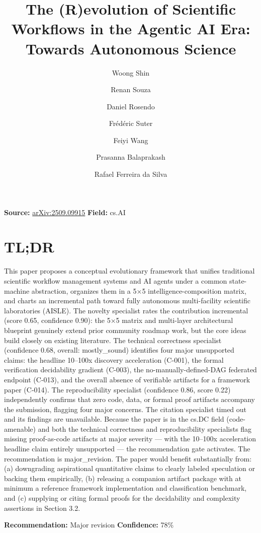 \documentclass[11pt]{article}
\title{The (R)evolution of Scientific Workflows in the Agentic AI Era: Towards Autonomous Science}
\author{Woong Shin \and Renan Souza \and Daniel Rosendo \and Frédéric Suter \and Feiyi Wang \and Prasanna Balaprakash \and Rafael Ferreira da Silva}
\date{}
\begin{document}
\maketitle

\noindent\textbf{Source:} \href{https://arxiv.org/abs/2509.09915}{arXiv:2509.09915} \quad \textbf{Field:} cs.AI\\

\section*{TL;DR}
This paper proposes a conceptual evolutionary framework that unifies traditional scientific workflow management systems and AI agents under a common state-machine abstraction, organizes them in a 5×5 intelligence-composition matrix, and charts an incremental path toward fully autonomous multi-facility scientific laboratories (AISLE). The novelty specialist rates the contribution incremental (score 0.65, confidence 0.90): the 5×5 matrix and multi-layer architectural blueprint genuinely extend prior community roadmap work, but the core ideas build closely on existing literature. The technical correctness specialist (confidence 0.68, overall: mostly\_sound) identifies four major unsupported claims: the headline 10–100x discovery acceleration (C-001), the formal verification decidability gradient (C-003), the no-manually-defined-DAG federated endpoint (C-013), and the overall absence of verifiable artifacts for a framework paper (C-014). The reproducibility specialist (confidence 0.86, score 0.22) independently confirms that zero code, data, or formal proof artifacts accompany the submission, flagging four major concerns. The citation specialist timed out and its findings are unavailable. Because the paper is in the cs.DC field (code-amenable) and both the technical correctness and reproducibility specialists flag missing proof-as-code artifacts at major severity — with the 10–100x acceleration headline claim entirely unsupported — the recommendation gate activates. The recommendation is major\_revision. The paper would benefit substantially from: (a) downgrading aspirational quantitative claims to clearly labeled speculation or backing them empirically, (b) releasing a companion artifact package with at minimum a reference framework implementation and classification benchmark, and (c) supplying or citing formal proofs for the decidability and complexity assertions in Section 3.2.

\textbf{Recommendation:} Major revision \quad \textbf{Confidence:} 78\%\\
\end{document}
